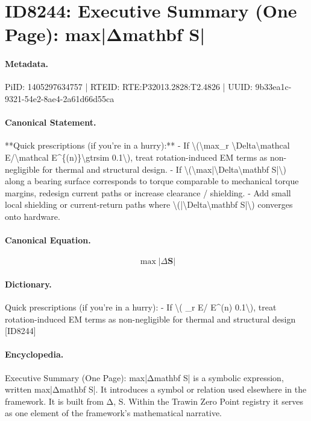 \section*{ID8244: Executive Summary (One Page): max|Δmathbf S|}
\paragraph{Metadata.}
PiID: 1405297634757 | RTEID: RTE:P32013.2828:T2.4826 | UUID: 9b33ea1c-9321-54e2-8ae4-2a61d66d55ca

\paragraph{Canonical Statement.}
**Quick prescriptions (if you’re in a hurry):** - If \textbackslash{}(\textbackslash{}max\_r \textbackslash{}Delta\textbackslash{}mathcal E/\textbackslash{}mathcal E\textasciicircum{}\{(n)\}\textbackslash{}gtrsim 0.1\textbackslash{}), treat rotation-induced EM terms as non-negligible for thermal and structural design. - If \textbackslash{}(\textbackslash{}max|\textbackslash{}Delta\textbackslash{}mathbf S|\textbackslash{}) along a bearing surface corresponds to torque comparable to mechanical torque margins, redesign current paths or increase clearance / shielding. - Add small local shielding or current-return paths where \textbackslash{}(|\textbackslash{}Delta\textbackslash{}mathbf S|\textbackslash{}) converges onto hardware.

\paragraph{Canonical Equation.}
\[
\max|\Delta\mathbf S|
\]

\paragraph{Dictionary.}
Quick prescriptions (if you’re in a hurry): - If \textbackslash{}( \_r E/ E\textasciicircum{}(n) 0.1\textbackslash{}), treat rotation-induced EM terms as non-negligible for thermal and structural design [ID8244]

\paragraph{Encyclopedia.}
Executive Summary (One Page): max|Δmathbf S| is a symbolic expression, written max|Δmathbf S|. It introduces a symbol or relation used elsewhere in the framework. It is built from Δ, S. Within the Trawin Zero Point registry it serves as one element of the framework's mathematical narrative.
